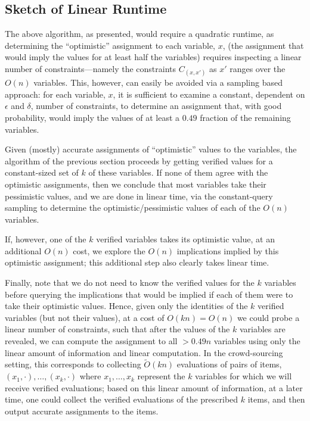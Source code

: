 \documentclass[final,12pt]{colt2018}
\newcommand{\eps}{\epsilon}
\begin{document}
\subsection{Sketch of Linear Runtime}\label{sec:linSketch}

The above algorithm, as presented, would require a quadratic runtime, as determining the ``optimistic'' assignment to each variable, $x$, (the assignment that would imply the values for at least half the variables) requires inspecting a linear number of constraints---namely the constraints $C_{(x,x')}$ as $x'$ ranges over the $O(n)$ variables.  This, however, can easily be avoided via a sampling based approach:  for each variable, $x$, it is sufficient to examine a constant, dependent on $\eps$ and $\delta$, number of constraints, to determine an assignment that, with good probability, would imply the values of at least a $0.49$ fraction of the remaining variables.

Given (mostly) accurate assignments of ``optimistic'' values to the variables, the algorithm of the previous section proceeds by getting verified values for a constant-sized set of $k$ of these variables.  If none of them agree with the optimistic assignments, then we conclude that most variables take their pessimistic values, and we are done in linear time, via the constant-query sampling to determine the optimistic/pessimistic values of each of the $O(n)$ variables.

If, however, one of the $k$ verified variables takes its optimistic value, at an additional $O(n)$ cost, we explore the $O(n)$ implications implied by this optimistic assignment; this additional step also clearly takes linear time.    

Finally, note that we do not need to know the verified values for the $k$ variables before querying the implications that would be implied if each of them were to take their optimistic values.  Hence, given only the identities of the $k$ verified variables (but not their values), at a cost of $O(kn)=O(n)$ we could probe a linear number of constraints, such that after the values of the $k$ variables are revealed, we can compute the assignment to all $> 0.49 n$ variables using only the linear amount of information and linear computation.   In the crowd-sourcing setting, this corresponds to collecting $\tilde{O}(kn)$ evaluations of pairs of items, $(x_1,\cdot),\ldots,(x_k,\cdot)$ where $x_1,\ldots,x_k$ represent the $k$ variables for which we will receive verified evaluations;  based on this linear amount of information, at a later time, one could collect the verified evaluations of the prescribed $k$ items, and then output accurate assignments to the items.
\end{document}
